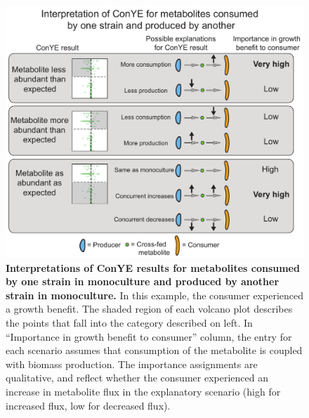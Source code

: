 \documentclass[11pt,twocolumn,notitlepage,openany,twoside]{book}
\begin{document}
\begin{figure}[tb]
\centering
\includegraphics[width=\linewidth]{ch2_fig5}
\caption[Interpretations of ConYE results for metabolites consumed by one strain in monoculture and produced by another strain in monoculture.]{\textbf{Interpretations of ConYE results for metabolites consumed by one strain in monoculture and produced by another strain in monoculture.} In this example, the consumer experienced a growth benefit. The shaded region of each volcano plot describes the points that fall into the category described on left. In “Importance in growth benefit to consumer” column, the entry for each scenario assumes that consumption of the metabolite is coupled with biomass production. The importance assignments are qualitative, and reflect whether the consumer experienced an increase in metabolite flux in the explanatory scenario (high for increased flux, low for decreased flux).}
\end{figure}
\end{document}
